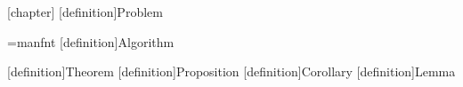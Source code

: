 \usepackage{booktabs}
\usepackage{caption}
\captionsetup[table]{skip=10pt}


\usepackage{mdframed}
\theoremstyle{definition}
[chapter]
[definition]{Problem}
\newtheorem*{examplex}{Example}
\font\manual=manfnt
\newenvironment{example}
    {\begin{examplex}}
    {\renewcommand{\qedsymbol}{\manual\char'170}\qed\end{examplex}}
\let\algorithm\relax
{}[definition]{Algorithm}
\theoremstyle{plain}
[definition]{Theorem}
[definition]{Proposition}
[definition]{Corollary}
[definition]{Lemma}
\theoremstyle{remark}
\newtheorem*{remarkx}{Remark}
\newenvironment{remark}
    {\begin{remarkx}}
    {\renewcommand{\qedsymbol}{\footnotesize $\triangle$}\qed\end{remarkx}}
\newenvironment{solution}{\begin{proof}[Solution]}{\end{proof}}

\usepackage{fancyhdr}
\usepackage{titling}
\pagestyle{fancy}
\fancyhf{}
\lhead{\textsc{\mytitle}}
\rfoot{\leftmark}
\rhead{\thepage}
\renewcommand{\footrulewidth}{0.5pt}
\date{2020 Epiphany Term}


\newcommand{\lecture}[2]{\marginpar{Lecture #1 \\ On #2}}

\usepackage{hyperref}
\hypersetup{
    colorlinks,
    citecolor=black,
    filecolor=black,
    linkcolor=black,
    urlcolor=black,
    pageanchor=false
}
